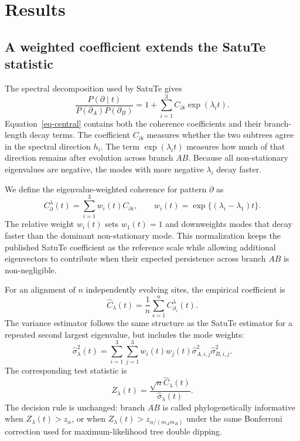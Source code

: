 \documentclass[11pt]{article}
\begin{document}
\section*{Results}

\subsection*{A weighted coefficient extends the SatuTe statistic}

The spectral decomposition used by SatuTe gives
\begin{equation}
\frac{P(\partial\mid t)}{P(\partial_A)P(\partial_B)}
=
1+\sum_{i=1}^{3} C_{\partial i}\exp(\lambda_i t).
\label{eq-central}
\end{equation}
Equation~\eqref{eq-central} contains both the coherence coefficients and their branch-length decay terms. The coefficient \(C_{\partial i}\) measures whether the two subtrees agree in the spectral direction \(h_i\). The term \(\exp(\lambda_i t)\) measures how much of that direction remains after evolution across branch \(AB\). Because all non-stationary eigenvalues are negative, the modes with more negative \(\lambda_i\) decay faster.

We define the eigenvalue-weighted coherence for pattern \(\partial\) as
\begin{equation}
C_{\partial}^{\lambda}(t)
=
\sum_{i=1}^{3} w_i(t)C_{\partial i},
\qquad
w_i(t)=\exp\{(\lambda_i-\lambda_1)t\}.
\label{eq-weighted-coherence}
\end{equation}
The relative weight \(w_i(t)\) sets \(w_1(t)=1\) and downweights modes that decay faster than the dominant non-stationary mode. This normalization keeps the published SatuTe coefficient as the reference scale while allowing additional eigenvectors to contribute when their expected persistence across branch \(AB\) is non-negligible.

For an alignment of \(n\) independently evolving sites, the empirical coefficient is
\begin{equation}
\hat C_{\lambda}(t)=\frac{1}{n}\sum_{s=1}^{n}C_{\partial_s}^{\lambda}(t).
\label{eq-weighted-mean}
\end{equation}
The variance estimator follows the same structure as the SatuTe estimator for a repeated second largest eigenvalue, but includes the mode weights:
\begin{equation}
\hat\sigma_{\lambda}^{2}(t)
=
\sum_{i=1}^{3}\sum_{j=1}^{3}
w_i(t)w_j(t)\hat\sigma_{A,i,j}^{2}\hat\sigma_{B,i,j}^{2}.
\label{eq-weighted-variance}
\end{equation}
The corresponding test statistic is
\begin{equation}
Z_{\lambda}(t)=\frac{\sqrt{n}\hat C_{\lambda}(t)}{\hat\sigma_{\lambda}(t)}.
\label{eq-weighted-z}
\end{equation}
The decision rule is unchanged: branch \(AB\) is called phylogenetically informative when \(Z_{\lambda}(t)>z_\alpha\), or when \(Z_{\lambda}(t)>z_{\alpha/(m_A m_B)}\) under the same Bonferroni correction used for maximum-likelihood tree double dipping.
\end{document}
